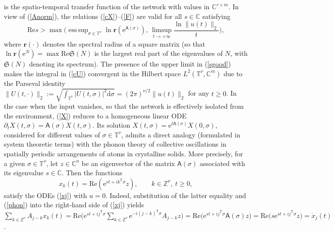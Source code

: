 \documentclass[letterpaper, 10pt, conference]{ieeeconf}  %
\def\>{\geqslant}           %
\def\d{\partial}
\def\Re{\mathrm{Re}}   %
\def\mZ{\mathbb{Z}}    %
\def\mC{\mathbb{C}}    %
\def\rT{\mathrm{T}}        %
\def\re{\mathrm{e}}        %
\def\rd{\mathrm{d}}        %
\def\br{\mathbf{r}}
\def\x{\times}
\def\fS{\mathfrak{S}}
\def\sA{\mathsf{A}}
\def\mT{\mathbb{T}}
\def\mZ{\mathbb{Z}}
\def\esssup{\mathop{\mathrm{ess\, sup}}}    %
\begin{document}
is the spatio-temporal transfer function of the network with values in $\mC^{r\x m}$. In view of (\ref{Anorm}), the relations (\ref{cX})--(\ref{F}) are valid for all $s\in \mC$ satisfying
\begin{equation}
\label{sgood}
  \Re s
  >
  \max
  \Big(
    \esssup_{\sigma \in \mT^\nu}
    \ln \br(\re^{\sA(\sigma)}),\,
  \limsup_{t\to +\infty}
    \frac{    \ln
    \|u(t)\|_2}{t}
  \Big),
\end{equation}
where $\br(\cdot)$ denotes the spectral radius of a square matrix (so that $\ln\br(\re^N) = \max \Re\fS(N)$
is the largest real part of the eigenvalues of $N$,
with $\fS(N)$ denoting its spectrum).
The presence of the upper limit in (\ref{sgood}) makes the integral in (\ref{cU}) convergent in the Hilbert space $L^2(\mT^\nu, \mC^m)$ due to the Parseval identity
$
    \|U(t,\cdot)\|_2
     :=
    \sqrt{
    \int_{\mT^\nu}
    |U(t,\sigma)|^2
    \rd \sigma}
    =
    (2\pi)^{\nu/2}
    \|u(t)\|_2
$
for any $t\>0$. In the case when the input vanishes, so that the network is effectively isolated from the environment,   (\ref{X}) reduces to a homogeneous linear ODE
$
    \d_t X(t,\sigma) = \sA(\sigma)X(t,\sigma)
$.
Its solution
$
    X(t,\sigma) = \re^{t\sA(\sigma)} X(0,\sigma)
$,
considered for different values of $\sigma \in \mT^\nu$,
admits a direct analogy (formulated in system theoretic terms) with the phonon theory \cite{S_1990} of collective oscillations  in
spatially periodic arrangements of atoms in
crystalline solids. More precisely, for a given $\sigma \in  \mT^\nu$, let $z \in \mC^n$ be an eigenvector of the matrix $\sA(\sigma)$ associated with its eigenvalue $s\in \mC$. %
Then the functions
\begin{equation}
\label{phon}
    x_k(t)
    =
    \Re(\re^{st + ik^{\rT} \sigma} z),
    \qquad
    k \in \mZ^\nu,\
    t\>0,
\end{equation}
satisfy the ODEs (\ref{xj}) with $u=0$. Indeed, substitution of the latter equality and (\ref{phon}) into the right-hand side of (\ref{xj}) yields
$
      \sum_{k \in \mZ^\nu}
  A_{j-k} x_k(t)
   =
  \Re
  \big(
  \re^{st + ij^{\rT} \sigma}   \sum_{k \in \mZ^\nu}\re^{-i(j-k)^{\rT} \sigma}A_{j-k}z
  \big)
  =
  \Re
  \big(
  \re^{st + ij^{\rT} \sigma}   \sA(\sigma)z
  \big)
  =
  \Re
  \big(
  s
  \re^{st + ij^{\rT} \sigma}   z
  \big) = \dot{x}_j(t)
$.
\end{document}
